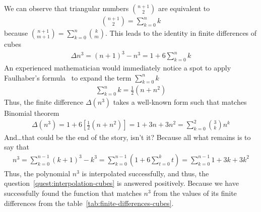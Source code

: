 We can observe that triangular numbers $\binom{n+1}{2}$ are equivalent to
\begin{align*}
    \binom{n+1}{2} = \sum_{k=0}^{n} k
\end{align*}
because $\binom{n+1}{m+1} = \sum_{k=0}^{n} \binom{k}{m}$.
This leads to the identity in finite differences of cubes
\begin{align*}
    \Delta n^3 = (n+1)^3 - n^3 = 1 + 6 \sum_{k=0}^{n} k
\end{align*}
An experienced mathematician would immediately notice a spot to apply Faulhaber's formula~\cite{beardon1996sums}
to expand the term $\sum_{k=0}^{n} k$
\begin{align*}
    \sum_{k=0}^{n} k = \frac{1}{2}(n+n^2)
\end{align*}
Thus, the finite difference $\Delta(n^3)$ takes a well-known form such
that matches Binomial theorem~\cite{abramowitz1988handbook}
\begin{align*}
    \Delta(n^3)
    = 1 + 6 \left[ \frac{1}{2}(n+n^2) \right]
    = 1 + 3 n + 3 n^2
    = \sum_{k=0}^{2} \binom{3}{k} n^k
\end{align*}
And\ldots that could be the end of the story, isn't it?
Because all what remains is to say that
\begin{align*}
    n^3
    = \sum_{k=0}^{n-1} (k+1)^3 - k^3
    = \sum_{k=0}^{n-1} \left( 1 + 6 \sum_{t=0}^{k} t \right)
    = \sum_{k=0}^{n-1} 1 + 3 k + 3 k^2
\end{align*}
Thus, the polynomial $n^3$ is interpolated successfully, and thus, the question~\eqref{quest:interpolation-cubes} is answered
positively.
Because we have successfully found the function that matches $n^3$ from the values of its finite differences from the
table~\eqref{tab:finite-differences-cubes}.


